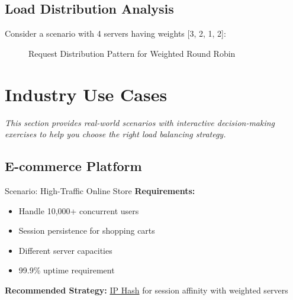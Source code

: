\documentclass[12pt,a4paper]{article}
\begin{document}
\subsection{Load Distribution Analysis}

Consider a scenario with 4 servers having weights [3, 2, 1, 2]:

\begin{figure}[H]
\centering
{}
\caption{Request Distribution Pattern for Weighted Round Robin}
\end{figure}

\section{Industry Use Cases}
\label{sec:usecases}

\textit{This section provides real-world scenarios with interactive decision-making exercises to help you choose the right load balancing strategy.}

\subsection{E-commerce Platform}
\label{subsec:ecommerce}

\begin{successbox}{Scenario: High-Traffic Online Store}
\textbf{Requirements:}
\begin{itemize}
    \item Handle 10,000+ concurrent users
    \item Session persistence for shopping carts
    \item Different server capacities
    \item 99.9\% uptime requirement
\end{itemize}

\textbf{Recommended Strategy:} \hyperref[subsec:iphash]{IP Hash} for session affinity with weighted servers
\end{successbox}
\end{document}
